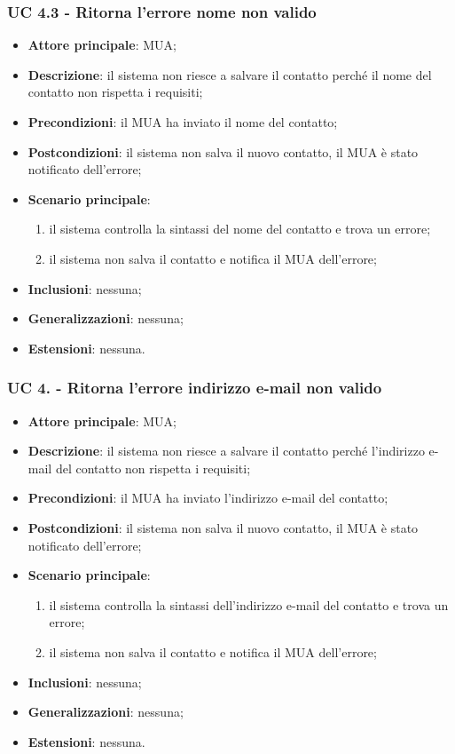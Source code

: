 \subsubsection{UC 4.3 - Ritorna l'errore nome non valido} \label{sec:UC4.3}
    \begin{itemize}
        \item \textbf{Attore principale}: MUA;
        \item \textbf{Descrizione}: il sistema non riesce a salvare il contatto perché il nome del contatto non rispetta i requisiti;
        \item \textbf{Precondizioni}: il MUA ha inviato il nome del contatto;
        \item \textbf{Postcondizioni}: il sistema non salva il nuovo contatto, il MUA è stato notificato dell'errore;
        \item \textbf{Scenario principale}:
            \begin{enumerate}
                \item il sistema controlla la sintassi del nome del contatto e trova un errore;
                \item il sistema non salva il contatto e notifica il MUA dell'errore;
            \end{enumerate}
        \item \textbf{Inclusioni}: nessuna;
        \item \textbf{Generalizzazioni}: nessuna;
        \item \textbf{Estensioni}: nessuna.
    \end{itemize}

\subsubsection{UC 4. - Ritorna l'errore indirizzo e-mail non valido} \label{sec:UC4.4}
    \begin{itemize}
        \item \textbf{Attore principale}: MUA;
        \item \textbf{Descrizione}: il sistema non riesce a salvare il contatto perché l'indirizzo e-mail del contatto non rispetta i requisiti;
        \item \textbf{Precondizioni}: il MUA ha inviato l'indirizzo e-mail del contatto;
        \item \textbf{Postcondizioni}: il sistema non salva il nuovo contatto, il MUA è stato notificato dell'errore;
        \item \textbf{Scenario principale}:
            \begin{enumerate}
                \item il sistema controlla la sintassi dell'indirizzo e-mail del contatto e trova un errore;
                \item il sistema non salva il contatto e notifica il MUA dell'errore;
            \end{enumerate}
        \item \textbf{Inclusioni}: nessuna;
        \item \textbf{Generalizzazioni}: nessuna;
        \item \textbf{Estensioni}: nessuna.
    \end{itemize}